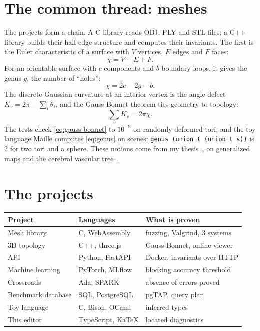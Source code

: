 \documentclass{article}
\begin{document}
\section{The common thread: meshes}\label{sec:meshes}
The projects form a chain. A C library reads OBJ, PLY and STL files; a C++ library builds their
half-edge structure and computes their invariants. The first is the Euler characteristic of a surface
with $V$ vertices, $E$ edges and $F$ faces:
\begin{equation}
\chi = V - E + F. \label{eq:euler}
\end{equation}
For an orientable surface with $c$ components and $b$ boundary loops, it gives the genus $g$, the
number of ``holes'':
\begin{equation}
\chi = 2c - 2g - b. \label{eq:genus}
\end{equation}
The discrete Gaussian curvature at an interior vertex is the angle defect $K_v = 2\pi - \sum_i
\theta_i$, and the Gauss-Bonnet theorem ties geometry to topology:
\begin{equation}
\sum_v K_v = 2\pi\chi. \label{eq:gauss-bonnet}
\end{equation}
The tests check \eqref{eq:gauss-bonnet} to $10^{-9}$ on randomly deformed tori, and the toy language
Maille computes \eqref{eq:genus} on scenes: \texttt{genus (union t (union t s))} is 2 for two tori and
a sphere. These notions come from my thesis~\cite{thesis}, on generalized maps and the cerebral
vascular tree~\cite{wscg}.

\section{The projects}\label{sec:projects}
\begin{tabular}{lll}
\hline
\textbf{Project} & \textbf{Languages} & \textbf{What is proven} \\
\hline
Mesh library & C, WebAssembly & fuzzing, Valgrind, 3 systems \\
3D topology & C++, three.js & Gauss-Bonnet, online viewer \\
API & Python, FastAPI & Docker, invariants over HTTP \\
Machine learning & PyTorch, MLflow & blocking accuracy threshold \\
Crossroads & Ada, SPARK & absence of errors proved \\
Benchmark database & SQL, PostgreSQL & pgTAP, query plan \\
Toy language & C, Bison, OCaml & inferred types \\
This editor & TypeScript, KaTeX & located diagnostics \\
\hline
\end{tabular}
\end{document}
